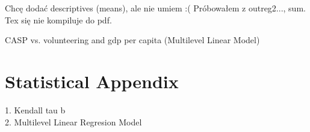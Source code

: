 \documentclass[10pt, letterpaper]{article}
\begin{document}
\begin{spacing}{1.4}
\begin{spacing}{.9}
Chcę dodać descriptives (means), ale nie umiem :( Próbowałem z outreg2..., sum. Tex się nie kompiluje do pdf.




\begin{spacing}{.9}
\begin{table}[H]
\centering 
\caption{CASP vs. volunteering and gdp per capita (Multilevel Linear Model)}  
\begin{scriptsize} 
	 
      \label{regB} 
\end{scriptsize}
\end{table}
\end{spacing}

\section{Statistical Appendix}

1. Kendall tau b \\
2. Multilevel Linear Regresion Model

\end{spacing}
\end{spacing}
\end{document}
